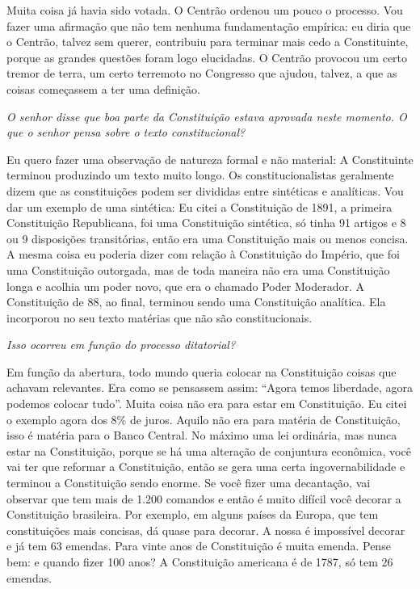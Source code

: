 Muita coisa já havia sido votada. O Centrão ordenou um pouco o processo.
Vou fazer uma afirmação que não tem nenhuma fundamentação empírica: eu
diria que o Centrão, talvez sem querer, contribuiu para terminar mais
cedo a Constituinte, porque as grandes questões foram logo elucidadas. O
Centrão provocou um certo tremor de terra, um certo terremoto no
Congresso que ajudou, talvez, a que as coisas começassem a ter uma
definição.

\medskip

\noindent\emph{O senhor disse que boa parte da Constituição estava aprovada
neste momento. O que o senhor pensa sobre o texto constitucional?}

Eu quero fazer uma observação de natureza formal e não
material: A Constituinte terminou produzindo um texto muito longo. Os
constitucionalistas geralmente dizem que as constituições podem ser
divididas entre sintéticas e analíticas. Vou dar um exemplo de uma
sintética: Eu citei a Constituição de 1891, a primeira Constituição
Republicana, foi uma Constituição sintética, só tinha 91 artigos e 8 ou
9 disposições transitórias, então era uma Constituição mais ou menos
concisa. A mesma coisa eu poderia dizer com relação à Constituição do
Império, que foi uma Constituição outorgada, mas de toda maneira não era
uma Constituição longa e acolhia um poder novo, que era o chamado Poder
Moderador. A Constituição de 88, ao final, terminou sendo uma
Constituição analítica. Ela incorporou no seu texto matérias que não são
constitucionais.

\medskip

\noindent\emph{Isso ocorreu em função do processo ditatorial?}

Em função da abertura, todo mundo queria colocar na
Constituição coisas que achavam relevantes. Era como se pensassem assim:
``Agora temos liberdade, agora podemos colocar tudo''. Muita coisa não
era para estar em Constituição. Eu citei o exemplo agora dos 8\% de
juros. Aquilo não era para matéria de Constituição, isso é matéria para
o Banco Central. No máximo uma lei ordinária, mas nunca estar na
Constituição, porque se há uma alteração de conjuntura econômica, você
vai ter que reformar a Constituição, então se gera uma certa
ingovernabilidade e terminou a Constituição sendo enorme. Se você fizer
uma decantação, vai observar que tem mais de 1.200 comandos e então é
muito difícil você decorar a Constituição brasileira. Por exemplo, em
alguns países da Europa, que tem constituições mais concisas, dá quase
para decorar. A nossa é impossível decorar e já tem 63 emendas. Para
vinte anos de Constituição é muita emenda. Pense bem: e quando fizer 100
anos? A Constituição americana é de 1787, só tem 26 emendas.

